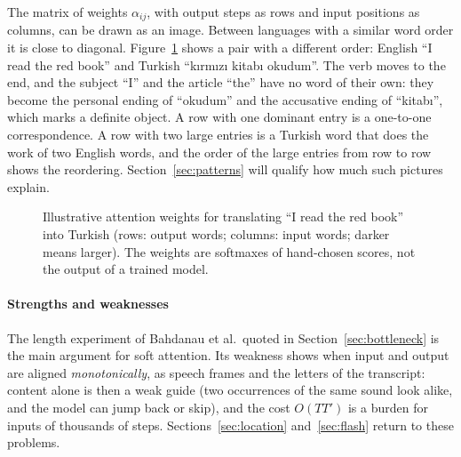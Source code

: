 \documentclass[11pt]{article}
\begin{document}
The matrix of weights $\alpha_{ij}$, with output steps as rows and input positions as columns, can be drawn as an image.
Between languages with a similar word order it is close to diagonal. Figure~\ref{fig:align} shows a pair with a
different order: English ``I read the red book'' and Turkish ``kırmızı kitabı okudum''. The verb moves to the end, and the
subject ``I'' and the article ``the'' have no word of their own: they become the personal ending of ``okudum'' and the
accusative ending of ``kitabı'', which marks a definite object. A row
with one dominant entry is a one-to-one correspondence. A row with two large entries is a Turkish word that does the work
of two English words, and the order of the large entries from row to row shows the reordering.
Section~\ref{sec:patterns} will qualify how much such pictures explain.

\begin{figure}[htbp]
\centering
{}
\caption{Illustrative attention weights for translating ``I read the red book'' into Turkish (rows: output words; columns:
input words; darker means larger). The weights are softmaxes of hand-chosen scores, not the output of a trained model.}
\label{fig:align}
\end{figure}

\paragraph{Strengths and weaknesses} The length experiment of Bahdanau et al.\ quoted in Section~\ref{sec:bottleneck} is
the main argument for soft attention. Its weakness shows when input and output are aligned \emph{monotonically}, as speech
frames and the letters of the transcript: content alone is then a weak guide (two occurrences of the same sound look alike,
and the model can jump back or skip), and the cost $O(TT')$ is a burden for inputs of thousands of steps.
Sections~\ref{sec:location} and~\ref{sec:flash} return to these problems.
\end{document}
